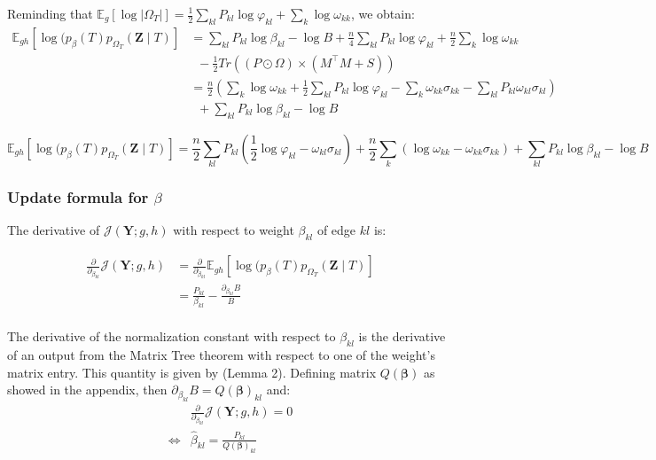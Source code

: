 \documentclass[11pt,a4paper]{article}
\newcommand{\betabf}{\boldsymbol{\beta}}
\newcommand{\Ybf}{\boldsymbol{Y}}
\newcommand{\Zbf}{\boldsymbol{Z}}
\newcommand{\Esp}{\mathds{E}}
\begin{document}
Reminding that $\Esp_g[\log |\Omega_{T}|]= \frac{1}{2}\sum _{kl} P_{kl}  \log\varphi_{kl}+ \sum_k \log \omega_{kk}$,  we obtain:
\begin{align*}
\Esp_{gh} [\log (p_\beta(T)p_{\Omega_T}(\Zbf\mid T) ] &=\sum_{kl} P_{kl} \log  \beta_{kl} - \log B + \frac{n}{4} \sum_{kl} P_{kl} \log\varphi_{kl} + \frac{n}{2}\sum_k \log \omega_{kk}\\
& \;\; - \frac{1}{2}Tr( (P \odot \Omega) \times (M^\intercal M +S))\\
&= \frac{n}{2}\left( \sum_k \log \omega_{kk}  + \frac{1}{2} \sum_{kl} P_{kl} \log \varphi_{kl} - \sum_{k} \omega_{kk} \sigma_{kk} - \sum_{kl} P_{kl} \omega_{kl} \sigma_{kl}\right)\\
& \;\; +\sum_{kl} P_{kl} \log  \beta_{kl} - \log B 
\end{align*}
 
 $$\boxed{\Esp_{gh} [\log (p_\beta(T)p_{\Omega_T}(\Zbf\mid T) ]  =  \frac{n}{2} \sum_{kl} P_{kl} ( \frac{1}{2} \log \varphi_{kl} -\omega_{kl} \sigma_{kl} ) + \frac{n}{2} \sum_k (\log \omega_{kk} - \omega_{kk} \sigma_{kk}) +\sum_{kl} P_{kl} \log  \beta_{kl} - \log B }$$
\subsubsection{Update formula for $\beta$}
 The derivative of $ \mathcal{J}(\Ybf ; g,h)$ with respect to weight $\beta_{kl}$ of edge $kl$ is:
 
 \begin{align*}
\frac{\partial}{\partial_{\beta_{kl}}} \mathcal{J}(\Ybf ; g,h) &=  \frac{\partial}{\partial_{\beta_{kl}}} \Esp_{gh} [\log (p_\beta(T)p_{\Omega_T}(\Zbf\mid T) ] \\
&= \frac{P_{kl}}{\beta_{kl}} - \frac{\partial_{\beta_{kl}} B }{B} \\
\end{align*}

The derivative of the normalization constant with respect to $\beta_{kl}$ is the derivative of an output from the Matrix Tree theorem with respect to one of the weight's matrix entry. This quantity is given by \citet{Meila} (Lemma 2). Defining matrix $Q(\betabf)$ as showed in the appendix, then $\partial_{\beta_{kl}} B = Q(\betabf)_{kl}$ and:
 \begin{align*}
&\frac{\partial}{\partial_{\beta_{kl}}} \mathcal{J}(\Ybf ; g,h) 
=0 \\
\iff & \boxed{\widehat{\beta}_{kl} = \frac{P_{kl}}{ Q(\betabf)_{kl}} }
\end{align*}
\end{document}
